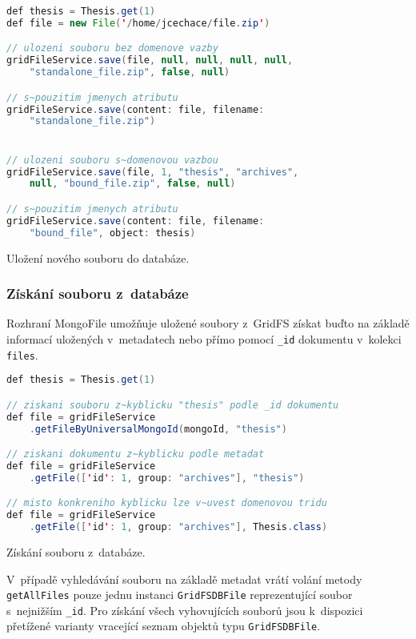 \begin{example}
    \centering
    \begin{lstlisting}[language=Java]
def thesis = Thesis.get(1)
def file = new File('/home/jcechace/file.zip')

// ulozeni souboru bez domenove vazby
gridFileService.save(file, null, null, null, null,
    "standalone_file.zip", false, null)

// s~pouzitim jmenych atributu
gridFileService.save(content: file, filename:
    "standalone_file.zip")


// ulozeni souboru s~domenovou vazbou
gridFileService.save(file, 1, "thesis", "archives",
    null, "bound_file.zip", false, null)

// s~pouzitim jmenych atributu
gridFileService.save(content: file, filename:
    "bound_file", object: thesis)
    \end{lstlisting}
    \caption{Uložení nového souboru do databáze.}
\end{example}

\subsubsection{\textbf{Získání souboru z~databáze}}
Rozhraní MongoFile umožňuje uložené soubory z~GridFS získat buďto na základě informací uložených v~metadatech nebo přímo pomocí \texttt{\_id} dokumentu v~kolekci \texttt{files}.

\begin{example}
    \centering
    \begin{lstlisting}[language=Java]
def thesis = Thesis.get(1)

// ziskani souboru z~kyblicku "thesis" podle _id dokumentu
def file = gridFileService
    .getFileByUniversalMongoId(mongoId, "thesis")

// ziskani dokumentu z~kyblicku podle metadat
def file = gridFileService
    .getFile(['id': 1, group: "archives"], "thesis")

// misto konkreniho kyblicku lze v~uvest domenovou tridu
def file = gridFileService
    .getFile(['id': 1, group: "archives"], Thesis.class)
    \end{lstlisting}
    \caption{Získání souboru z~databáze.}
\end{example}

V~případě vyhledávání souboru na základě metadat vrátí volání metody \texttt{getAllFiles} pouze jednu instanci \texttt{GridFSDBFile} reprezentující soubor s~nejnižším \texttt{\_id}. Pro získání všech vyhovujících souborů jsou k~dispozici přetížené varianty vracející seznam objektů typu \texttt{GridFSDBFile}.

